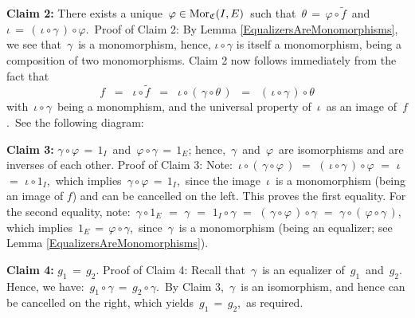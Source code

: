 \vskip 0.3cm
\noindent
\textbf{Claim 2:}\;\; There exists a unique \,$\varphi \in \textnormal{Mor}_{\mathfrak{C}}(I,E)$\, such that
\,$\theta \,=\, \varphi \circ \widetilde{f}$\,
and
\,$\iota \,=\, (\,\iota \circ \gamma\,) \circ \varphi$.\,
\vskip 0.1cm
\noindent
Proof of Claim 2:\; 
By Lemma \ref{EqualizersAreMonomorphisms}, we see that \,$\gamma$\, is a monomorphism,
hence, $\iota \circ \gamma$ is itself a monomorphism, being a composition of two monomorphisms.
Claim 2 now follows immediately from the fact that
\begin{equation*}
f
\;\; = \;\;
	\iota \circ \widetilde{f}
\;\; = \;\;
	\iota \circ (\,\gamma \circ \theta\,)
\;\; = \;\;
	(\,\iota \circ \gamma\,) \circ \theta
\end{equation*}
with \,$\iota \circ \gamma$\, being a monomphism,
and the universal property of \,$\iota$\, as an image of \,$f$.\,
See the following diagram:
\begin{center}
\end{center}

\vskip 0.3cm
\noindent
\textbf{Claim 3:}\;\; $\gamma \circ \varphi \,=\, 1_{I}$\, and \,$\varphi \circ \gamma \,=\, 1_{E}$;
hence, \,$\gamma$\, and \,$\varphi$\, are isomorphisms and are inverses of each other.
\vskip 0.1cm
\noindent
Proof of Claim 3:\;  Note:
\,$\iota \circ (\,\gamma \circ \varphi\,)$
\;$=$\; $(\,\iota \circ \gamma\,) \circ \varphi$
\;$=$\; $\iota$
\;$=$\; $\iota \circ 1_{I}$,\,
which implies
\,$\gamma \circ \varphi \,=\, 1_{I}$,\,
since the image \,$\iota$\, is a monomorphism (being an image of $f$) and can be cancelled on the left.
This proves the first equality.
For the second equality, note:
\,$\gamma \circ 1_{E}$
\;$=$\; $\gamma$
\;$=$\; $1_{I} \circ \gamma$
\;$=$\; $(\,\gamma \circ \varphi\,) \circ \gamma$
\;$=$\; $\gamma \circ (\,\varphi \circ \gamma\,)$,\,
which implies
\,$1_{E} \,=\, \varphi \circ \gamma$,\,
since \,$\gamma$\, is a monomorphism (being an equalizer; see Lemma \ref{EqualizersAreMonomorphisms}).

\vskip 0.4cm
\noindent
\textbf{Claim 4:}\;\; $g_{1} \,=\, g_{2}$.
\vskip 0.1cm
\noindent
Proof of Claim 4:\;  Recall that \,$\gamma$\, is an equalizer of \,$g_{1}$\, and \,$g_{2}$.\,
Hence, we have: \,$g_{1} \circ \gamma \,=\, g_{2} \circ \gamma$.\,
By Claim 3, \,$\gamma$\, is an isomorphism, and hence can be cancelled on the right,
which yields \,$g_{1} \,=\, g_{2}$,\, as required.

